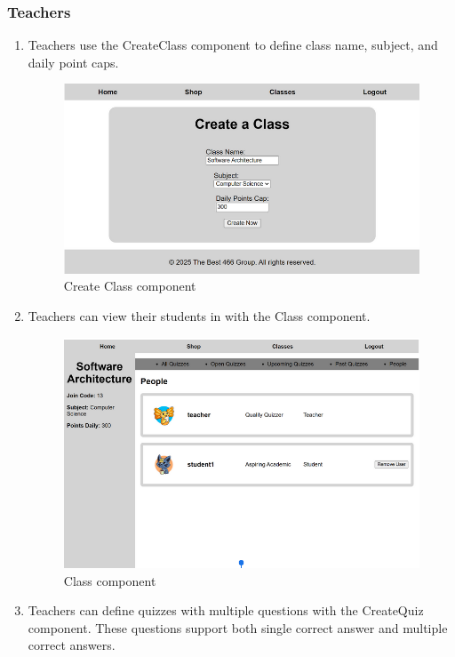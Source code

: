 \subsubsection{Teachers}
\begin{enumerate}
    \item Teachers use the CreateClass component to define class name, subject, and daily point caps.
    \begin{figure}[h]
        \centering
        \includegraphics[width=0.7\linewidth]{PUT INDIVIDUAL SECTIONS HERE/images/createClass.png}
        \caption{Create Class component}
        \label{fig:enter-label}
    \end{figure}
        \item Teachers can view their students in with the Class component.
    \begin{figure}[H]
        \centering
        \includegraphics[width=0.7\linewidth]{PUT INDIVIDUAL SECTIONS HERE/images/classOverview.png}
        \caption{Class component}
        \label{class-overview}
    \end{figure}
        \item Teachers can define quizzes with multiple questions with the CreateQuiz component. These questions support both single correct answer and multiple correct answers.
    \begin{figure}[H]
        \centering

\end{figure}
\end{enumerate}
